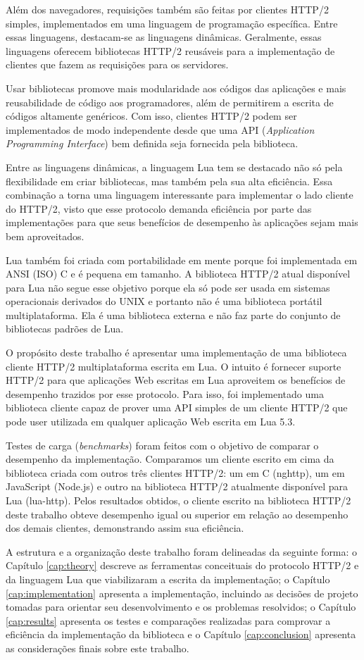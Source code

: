 Além dos navegadores, requisições também são feitas por clientes HTTP/2 simples, implementados em uma linguagem de programação específica. Entre essas linguagens, destacam-se as linguagens dinâmicas. Geralmente, essas linguagens oferecem bibliotecas HTTP/2 reusáveis para a implementação de clientes que fazem as requisições para os servidores.

Usar bibliotecas promove mais modularidade aos códigos das aplicações e mais reusabilidade de código aos programadores, além de permitirem a escrita de códigos altamente genéricos. Com isso, clientes HTTP/2 podem ser implementados de modo independente desde que uma API ({\em Application Programming Interface}) bem definida seja fornecida pela biblioteca.

Entre as linguagens dinâmicas, a linguagem Lua \cite{Ierusalimschy2016PiL} tem se destacado não só pela flexibilidade em criar bibliotecas, mas também pela sua alta eficiência. Essa combinação a torna uma linguagem interessante para implementar o lado cliente do HTTP/2, visto que esse protocolo demanda eficiência por parte das implementações para que seus benefícios de desempenho às aplicações sejam mais bem aproveitados.

Lua também foi criada com portabilidade em mente porque foi implementada em ANSI (ISO) C e é pequena em tamanho. A biblioteca HTTP/2 atual \cite{DaurminatorLuaHTTP} disponível para Lua não segue esse objetivo porque ela só pode ser usada em sistemas operacionais derivados do UNIX e portanto não é uma biblioteca portátil multiplataforma. Ela é uma biblioteca externa e não faz parte do conjunto de bibliotecas padrões de Lua.

O propósito deste trabalho é apresentar uma implementação de uma biblioteca cliente HTTP/2 multiplataforma escrita em Lua. O intuito é fornecer suporte HTTP/2 para que aplicações Web escritas em Lua aproveitem os benefícios de desempenho trazidos por esse protocolo. Para isso, foi implementado uma biblioteca cliente capaz de prover uma API simples de um cliente HTTP/2 que pode user utilizada em qualquer aplicação Web escrita em Lua 5.3.

Testes de carga ({\em benchmarks}) foram feitos com o objetivo de comparar o desempenho da implementação. Comparamos um cliente escrito em cima da biblioteca criada com outros três clientes HTTP/2: um em C (nghttp), um em JavaScript (Node.js) e outro na biblioteca HTTP/2 atualmente disponível para Lua (lua-http). Pelos resultados obtidos, o cliente escrito na biblioteca HTTP/2 deste trabalho obteve desempenho igual ou superior em relação ao desempenho dos demais clientes, demonstrando assim sua eficiência.

A estrutura e a organização deste trabalho foram delineadas da seguinte forma: o Capítulo \ref{cap:theory} descreve as ferramentas conceituais do protocolo HTTP/2 e da linguagem Lua que viabilizaram a escrita da implementação; o Capítulo \ref{cap:implementation} apresenta a implementação, incluindo as decisões de projeto tomadas para orientar seu desenvolvimento e os problemas resolvidos; o Capítulo \ref{cap:results} apresenta os testes e comparações realizadas para comprovar a eficiência da implementação da biblioteca e o Capítulo \ref{cap:conclusion} apresenta as considerações finais sobre este trabalho.